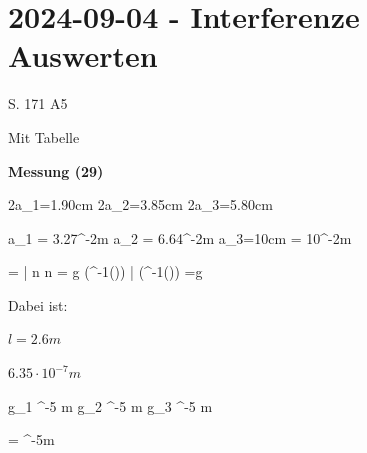 \section{2024-09-04 - Interferenze Auswerten}

\startitemize
\item
  S. 171 A5
\item
  Mit Tabelle
\stopitemize

\startframedtask
{\bf Messung (29)}

\startformula 
\startalign
\NC 2a_1=1.90cm\NR
\NC 2a_2=3.85cm\NR
\NC 2a_3=5.80cm\NR
\stopalign
 \stopformula

\stopframedtask

\startformula 
\startalign
\NC a_1\approx 3.27cm \NC = 3.27^{-2}m\NR
\NC a_2\approx 6.64cm \NC = 6.64^{-2}m\NR
\NC a_3=10cm          \NC = 10^{-2}m\NR
\stopalign
 \stopformula

\textpartdivider

\startformula 
\startalign[n=3]
\NC \lambda \NC =  \quad \NC | \cdot n \NR
\NC n \lambda \NC = g \cdot \sin(\tan^{-1}()) \quad \NC | \div \sin(\tan^{-1}()) \NR
\NC {}\NC=g \NC \NR
\stopalign
 \stopformula

Dabei ist:

\startitemize[packed]
\item
  $l = 2.6m$
\item
  $6.35\cdot 10^{-7}m$
\stopitemize

\startformula 
\startalign
\NC {} \quad \NC g_1 ^{-5} m \NR
\NC {} \quad \NC g_2 ^{-5} m \NR
\NC {} \quad \NC g_3 ^{-5} m \NR
\stopalign
 \stopformula

\textpartdivider

\startformula 
{} = ^{-5}m
 \stopformula
